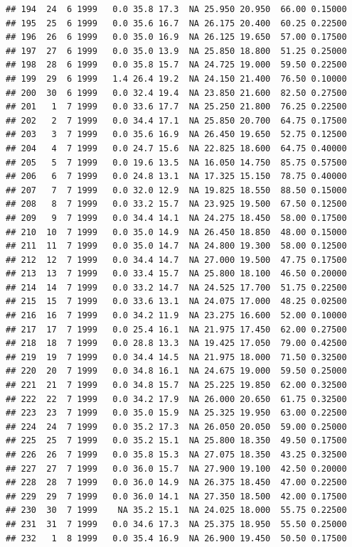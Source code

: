 \documentclass[
]{book}
\begin{document}
\begin{verbatim}
## 194  24  6 1999   0.0 35.8 17.3  NA 25.950 20.950  66.00 0.15000
## 195  25  6 1999   0.0 35.6 16.7  NA 26.175 20.400  60.25 0.22500
## 196  26  6 1999   0.0 35.0 16.9  NA 26.125 19.650  57.00 0.17500
## 197  27  6 1999   0.0 35.0 13.9  NA 25.850 18.800  51.25 0.25000
## 198  28  6 1999   0.0 35.8 15.7  NA 24.725 19.000  59.50 0.22500
## 199  29  6 1999   1.4 26.4 19.2  NA 24.150 21.400  76.50 0.10000
## 200  30  6 1999   0.0 32.4 19.4  NA 23.850 21.600  82.50 0.27500
## 201   1  7 1999   0.0 33.6 17.7  NA 25.250 21.800  76.25 0.22500
## 202   2  7 1999   0.0 34.4 17.1  NA 25.850 20.700  64.75 0.17500
## 203   3  7 1999   0.0 35.6 16.9  NA 26.450 19.650  52.75 0.12500
## 204   4  7 1999   0.0 24.7 15.6  NA 22.825 18.600  64.75 0.40000
## 205   5  7 1999   0.0 19.6 13.5  NA 16.050 14.750  85.75 0.57500
## 206   6  7 1999   0.0 24.8 13.1  NA 17.325 15.150  78.75 0.40000
## 207   7  7 1999   0.0 32.0 12.9  NA 19.825 18.550  88.50 0.15000
## 208   8  7 1999   0.0 33.2 15.7  NA 23.925 19.500  67.50 0.12500
## 209   9  7 1999   0.0 34.4 14.1  NA 24.275 18.450  58.00 0.17500
## 210  10  7 1999   0.0 35.0 14.9  NA 26.450 18.850  48.00 0.15000
## 211  11  7 1999   0.0 35.0 14.7  NA 24.800 19.300  58.00 0.12500
## 212  12  7 1999   0.0 34.4 14.7  NA 27.000 19.500  47.75 0.17500
## 213  13  7 1999   0.0 33.4 15.7  NA 25.800 18.100  46.50 0.20000
## 214  14  7 1999   0.0 33.2 14.7  NA 24.525 17.700  51.75 0.22500
## 215  15  7 1999   0.0 33.6 13.1  NA 24.075 17.000  48.25 0.02500
## 216  16  7 1999   0.0 34.2 11.9  NA 23.275 16.600  52.00 0.10000
## 217  17  7 1999   0.0 25.4 16.1  NA 21.975 17.450  62.00 0.27500
## 218  18  7 1999   0.0 28.8 13.3  NA 19.425 17.050  79.00 0.42500
## 219  19  7 1999   0.0 34.4 14.5  NA 21.975 18.000  71.50 0.32500
## 220  20  7 1999   0.0 34.8 16.1  NA 24.675 19.000  59.50 0.25000
## 221  21  7 1999   0.0 34.8 15.7  NA 25.225 19.850  62.00 0.32500
## 222  22  7 1999   0.0 34.2 17.9  NA 26.000 20.650  61.75 0.32500
## 223  23  7 1999   0.0 35.0 15.9  NA 25.325 19.950  63.00 0.22500
## 224  24  7 1999   0.0 35.2 17.3  NA 26.050 20.050  59.00 0.25000
## 225  25  7 1999   0.0 35.2 15.1  NA 25.800 18.350  49.50 0.17500
## 226  26  7 1999   0.0 35.8 15.3  NA 27.075 18.350  43.25 0.32500
## 227  27  7 1999   0.0 36.0 15.7  NA 27.900 19.100  42.50 0.20000
## 228  28  7 1999   0.0 36.0 14.9  NA 26.375 18.450  47.00 0.22500
## 229  29  7 1999   0.0 36.0 14.1  NA 27.350 18.500  42.00 0.17500
## 230  30  7 1999    NA 35.2 15.1  NA 24.025 18.000  55.75 0.22500
## 231  31  7 1999   0.0 34.6 17.3  NA 25.375 18.950  55.50 0.25000
## 232   1  8 1999   0.0 35.4 16.9  NA 26.900 19.450  50.50 0.17500

\end{verbatim}
\end{document}
